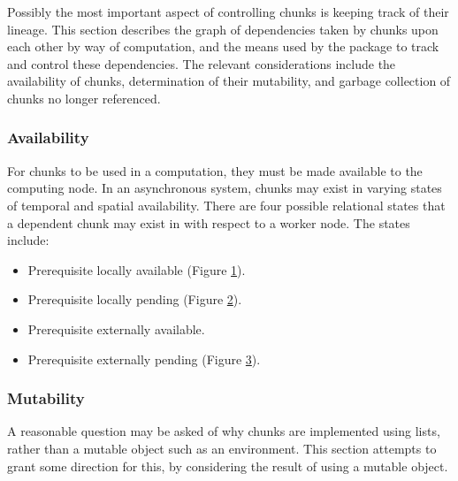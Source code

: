 Possibly the most important aspect of controlling chunks is keeping track of their lineage.
This section describes the graph of dependencies taken by chunks upon each other by way of computation, and the means used by the  package to track and control these dependencies.
The relevant considerations include the availability of chunks, determination of their mutability, and garbage collection of chunks no longer referenced.

\subsubsection{Availability}

For chunks to be used in a computation, they must be made available to the computing node.
In an asynchronous system, chunks may exist in varying states of temporal and spatial availability.
There are four possible relational states that a dependent chunk may exist in with respect to a worker node.
The states include:

\begin{itemize}
\item Prerequisite locally available (Figure \cref{fig:comm-la}).
\item Prerequisite locally pending (Figure \cref{fig:comm-lp}).
\item Prerequisite externally available.
\item Prerequisite externally pending (Figure \cref{fig:comm-ep}).
\end{itemize}

\begin{figure}

\label{fig:comm-la}
\end{figure}

\begin{figure}

\label{fig:comm-lp}
\end{figure}

\begin{figure}

\label{fig:comm-ep}
\end{figure}

\subsubsection{Mutability}

A reasonable question may be asked of why chunks are implemented using lists, rather than a mutable object such as an environment.
This section attempts to grant some direction for this, by considering the result of using a mutable object.

